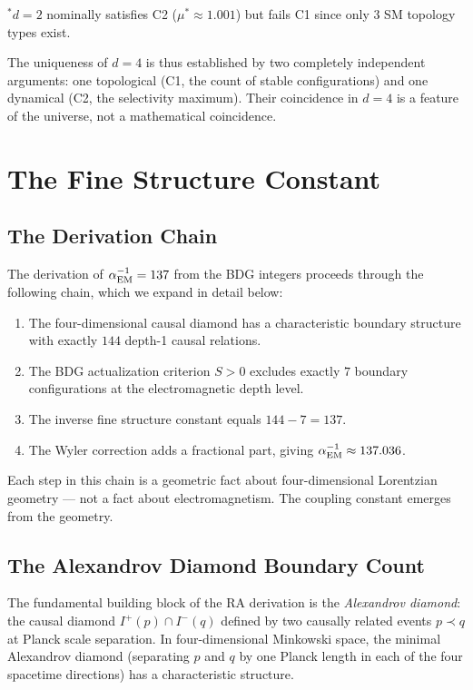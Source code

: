 \documentclass[12pt,a4paper]{article}
\begin{document}
${}^*d=2$ nominally satisfies C2 ($\mu^*\approx1.001$) but fails C1 since only 3 SM topology types exist.

The uniqueness of $d=4$ is thus established by two completely independent arguments: one topological (C1, the count of stable configurations) and one dynamical (C2, the selectivity maximum).  Their coincidence in $d=4$ is a feature of the universe, not a mathematical coincidence.


\section{The Fine Structure Constant}\label{sec:alphaEM}

\subsection{The Derivation Chain}

The derivation of $\alpha_{\rm EM}^{-1}=137$ from the BDG integers proceeds through the following chain, which we expand in detail below:
\begin{enumerate}
  \item The four-dimensional causal diamond has a characteristic boundary structure with exactly $144$ depth-1 causal relations.
  \item The BDG actualization criterion $S>0$ excludes exactly $7$ boundary configurations at the electromagnetic depth level.
  \item The inverse fine structure constant equals $144-7=137$.
  \item The Wyler correction \cite{Wyler1969} adds a fractional part, giving $\alpha_{\rm EM}^{-1}\approx137.036$.
\end{enumerate}

Each step in this chain is a geometric fact about four-dimensional Lorentzian geometry --- not a fact about electromagnetism.  The coupling constant emerges from the geometry.

\subsection{The Alexandrov Diamond Boundary Count}

The fundamental building block of the RA derivation is the \emph{Alexandrov diamond}: the causal diamond $I^+(p)\cap I^-(q)$ defined by two causally related events $p\prec q$ at Planck scale separation.  In four-dimensional Minkowski space, the minimal Alexandrov diamond (separating $p$ and $q$ by one Planck length in each of the four spacetime directions) has a characteristic structure.
\end{document}
